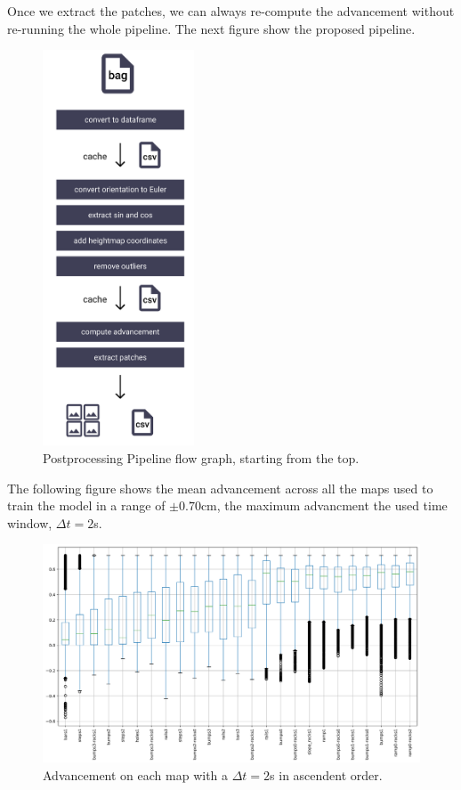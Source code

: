 \documentclass[../document.tex]{subfiles}
\begin{document}
Once we extract the patches, we can always re-compute the advancement without re-running the whole pipeline. The next figure show the proposed pipeline.
\begin{figure}[htbp] 
\centering
\includegraphics[width=0.4\textwidth]{../img/postprocessing-pipeline.png}
\caption{Postprocessing Pipeline flow graph, starting from the top.}
\label{fig: postprocessing-pipeline}
\end{figure}
The following figure shows the mean advancement across all the maps used to train the model in a range of $\pm 0.70$cm, the maximum advancment the used time window, $\Delta t = 2$s.
\begin{figure}[htbp]
    \centering
    \includegraphics[width=\linewidth]{../img/datasets/box_for_each_map.png}
    \caption{Advancement on each map with a $\Delta t = 2$s in ascendent order.}
\end{figure}
\end{document}
